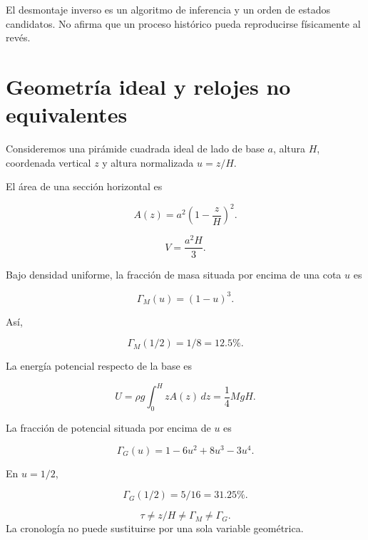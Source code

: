 \begin{remark}
El desmontaje inverso es un algoritmo de inferencia y un orden de estados candidatos. No afirma que un proceso histórico pueda reproducirse físicamente al revés.
\end{remark}

\section{Geometría ideal y relojes no equivalentes}

Consideremos una pirámide cuadrada ideal de lado de base \(a\), altura \(H\), coordenada vertical \(z\) y altura normalizada \(u=z/H\).

El área de una sección horizontal es

\begin{equation}
A(z)
=
a^2
\left(1-\frac{z}{H}\right)^2.
\end{equation}

\begin{proposition}
\begin{equation}
\boxed{
V=\frac{a^2H}{3}.
}
\end{equation}
\end{proposition}

Bajo densidad uniforme, la fracción de masa situada por encima de una cota \(u\) es

\begin{equation}
\boxed{
\Gamma_M(u)
=
(1-u)^3.
}
\end{equation}

Así,

\begin{equation}
\Gamma_M(1/2)=1/8=12.5\%.
\end{equation}

La energía potencial respecto de la base es

\begin{equation}
U
=
\rho g
\int_0^H zA(z)\,dz
=
\frac14MgH.
\end{equation}

La fracción de potencial situada por encima de \(u\) es

\begin{equation}
\boxed{
\Gamma_G(u)
=
1-6u^2+8u^3-3u^4.
}
\end{equation}

En \(u=1/2\),

\begin{equation}
\Gamma_G(1/2)=5/16=31.25\%.
\end{equation}

\begin{principle}
\begin{equation}
\boxed{
\tau
\neq
z/H
\neq
\Gamma_M
\neq
\Gamma_G.
}
\end{equation}
La cronología no puede sustituirse por una sola variable geométrica.
\end{principle}

